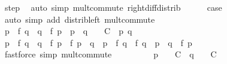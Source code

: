 \begin{isabellebody}
\ step{}\ \isamarkupfalse%
\ {\isacharparenleft}{\kern0pt}auto\ simp{\isacharcolon}{\kern0pt}\ mult{\isachardot}{\kern0pt}commute\ right{\isacharunderscore}{\kern0pt}diff{\isacharunderscore}{\kern0pt}distrib{\isacharprime}{\kern0pt}{\isacharparenright}{\kern0pt}\isanewline
\ \ \ \ \isamarkupfalse%
\ {\isacharquery}{\kern0pt}case\ \isamarkupfalse%
\ {\isacharparenleft}{\kern0pt}auto\ simp\ add{\isacharcolon}{\kern0pt}\ distrib{\isacharunderscore}{\kern0pt}left\ mult{\isachardot}{\kern0pt}commute{\isacharparenright}{\kern0pt}\isanewline
\ \ \isamarkupfalse%
\isanewline
\isanewline
\ \ \isamarkupfalse%
\ {\isachardoublequoteopen}{\isasymbar}p\ {\isacharasterisk}{\kern0pt}\ f\ q\ {\isacharminus}{\kern0pt}\ q\ {\isacharasterisk}{\kern0pt}\ f\ p{\isasymbar}\ {\isasymle}\ {\isacharparenleft}{\kern0pt}{\isasymbar}p{\isasymbar}\ {\isacharplus}{\kern0pt}\ {\isasymbar}q{\isasymbar}\ {\isacharplus}{\kern0pt}\ {}{\isacharparenright}{\kern0pt}\ {\isacharasterisk}{\kern0pt}\ C{\isachardoublequoteclose}\ \ p\ q\isanewline
\ \ \isamarkupfalse%
\ {\isacharminus}{\kern0pt}\isanewline
\ \ \ \ \isamarkupfalse%
\ {\isachardoublequoteopen}{\isasymbar}p\ {\isacharasterisk}{\kern0pt}\ f\ q\ {\isacharminus}{\kern0pt}\ q\ {\isacharasterisk}{\kern0pt}\ f\ p{\isasymbar}\ {\isasymle}\ {\isasymbar}f\ {\isacharparenleft}{\kern0pt}p\ {\isacharasterisk}{\kern0pt}\ q{\isacharparenright}{\kern0pt}\ {\isacharminus}{\kern0pt}\ p\ {\isacharasterisk}{\kern0pt}\ f\ q{\isasymbar}\ {\isacharplus}{\kern0pt}\ {\isasymbar}f\ {\isacharparenleft}{\kern0pt}q\ {\isacharasterisk}{\kern0pt}\ p{\isacharparenright}{\kern0pt}\ {\isacharminus}{\kern0pt}\ q\ {\isacharasterisk}{\kern0pt}\ f\ p{\isasymbar}{\isachardoublequoteclose}\ \isamarkupfalse%
\ {\isacharparenleft}{\kern0pt}fastforce\ simp{\isacharcolon}{\kern0pt}\ mult{\isachardot}{\kern0pt}commute{\isacharparenright}{\kern0pt}\isanewline
\ \ \ \ \isamarkupfalse%
\ \isamarkupfalse%
\ {\isachardoublequoteopen}{\isachardot}{\kern0pt}{\isachardot}{\kern0pt}{\isachardot}{\kern0pt}\ {\isasymle}\ {\isacharparenleft}{\kern0pt}{\isasymbar}p{\isasymbar}\ {\isacharplus}{\kern0pt}\ {}{\isacharparenright}{\kern0pt}\ {\isacharasterisk}{\kern0pt}\ C\ {\isacharplus}{\kern0pt}\ {\isacharparenleft}{\kern0pt}{\isasymbar}q{\isasymbar}\ {\isacharplus}{\kern0pt}\ {}{\isacharparenright}{\kern0pt}\ {\isacharasterisk}{\kern0pt}\ C{\isachardoublequoteclose}\ \isamarkupfalse%

\end{isabellebody}
